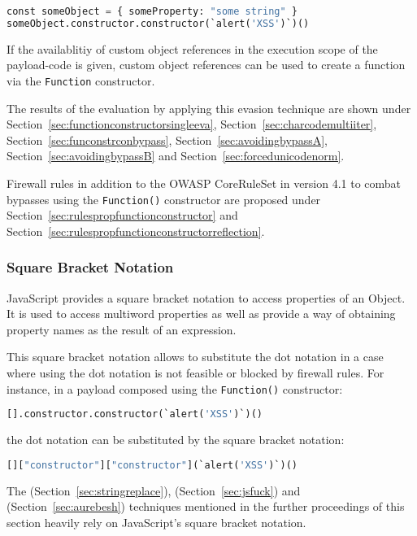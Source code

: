 \begin{lstlisting}[style=basicStyle,language=Python,escapeinside=\^\^]
const someObject = { someProperty: "some string" }
someObject.constructor.constructor(`alert('XSS')`)()
\end{lstlisting}

If the availablitiy of custom object references in the execution scope of the payload-code is given, custom object references can be used to create a function via the \verb|Function| constructor.

The results of the evaluation by applying this evasion technique are shown under Section~\ref{sec:functionconstructorsingleeva}, Section~\ref{sec:charcodemultiiter}, Section~\ref{sec:funconstrconbypass}, Section~\ref{sec:avoidingbypassA}, Section~\ref{sec:avoidingbypassB} and Section~\ref{sec:forcedunicodenorm}.

Firewall rules in addition to the OWASP CoreRuleSet in version 4.1 to combat bypasses using the \verb|Function()| constructor are proposed under Section~\ref{sec:rulespropfunctionconstructor} and Section~\ref{sec:rulespropfunctionconstructorreflection}.


\subsubsection{Square Bracket Notation}
\label{sec:sbn}
JavaScript provides a square bracket notation to access properties of an Object. It is used to access multiword properties as well as provide a way of obtaining property names as the result of an expression. \cite{js/brackets}

This square bracket notation allows to substitute the dot notation in a case where using the dot notation is not feasible or blocked by firewall rules.
For instance, in a payload composed using the \verb|Function()| constructor:

\begin{lstlisting}[style=basicStyle,language=Python]
[].constructor.constructor(`alert('XSS')`)()
\end{lstlisting}

the dot notation can be substituted by the square bracket notation:

\begin{lstlisting}[style=basicStyle,language=Python]
[]["constructor"]["constructor"](`alert('XSS')`)()
\end{lstlisting}

The  (Section~\ref{sec:stringreplace}),  (Section~\ref{sec:jsfuck}) and  (Section~\ref{sec:aurebesh}) techniques mentioned in the further proceedings of this section heavily rely on JavaScript's square bracket notation.

